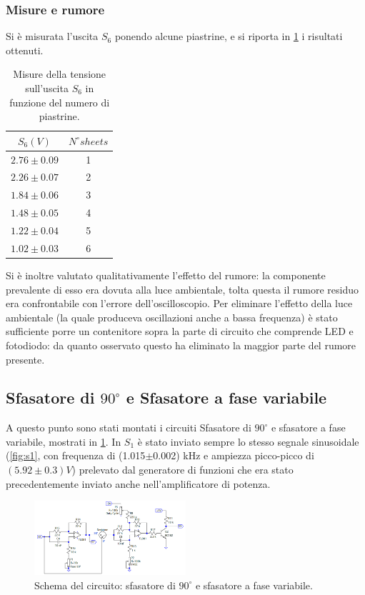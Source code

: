 \documentclass[a4paper,10pt]{article}
\begin{document}
\subsubsection*{Misure e rumore}

Si è misurata l'uscita $ S_6 $ ponendo alcune piastrine, e si riporta in \cref{tab:s6} i risultati ottenuti.

\begin{table}[H]
	\centering
	\begin{tabular}{cc}
		$ S_6 (V)$ & $ N^\circ sheets $\\
		\hline
		$ 2.76 \pm 0.09$	& 1\\
		$ 2.26 \pm 0.07$	& 2\\
		$ 1.84 \pm 0.06$	& 3\\
		$ 1.48 \pm 0.05$	& 4\\
		$ 1.22 \pm 0.04$	& 5\\
		$ 1.02 \pm 0.03$	& 6\\		
	\end{tabular}
\caption{Misure della tensione sull'uscita $ S_6 $ in funzione del numero di piastrine.}
\label{tab:s6}
\end{table}

Si è inoltre valutato qualitativamente l'effetto del rumore: la componente prevalente di esso era dovuta alla luce ambientale, tolta questa il rumore residuo era confrontabile con l'errore dell'oscilloscopio.
Per eliminare l'effetto della luce ambientale (la quale produceva oscillazioni anche a bassa frequenza) è stato sufficiente porre un contenitore sopra la parte di circuito che comprende LED e fotodiodo: da quanto osservato questo ha eliminato la maggior parte del rumore presente.

\subsection{Sfasatore di $90^\circ$ e Sfasatore a fase variabile}

A questo punto sono stati montati i circuiti Sfasatore di $90^\circ$ e sfasatore a fase variabile, mostrati in \cref{fig:deph}. In $S_1$ è stato inviato sempre lo stesso segnale sinusoidale (\cref{fig:s1}, con frequenza di (1.015$\pm$0.002) kHz e ampiezza picco-picco di $(5.92\pm0.3)V$) prelevato dal generatore di funzioni che era stato precedentemente inviato anche nell'amplificatore di potenza.

\begin{figure}[H]
	\centering
	\includegraphics[width=0.5\textwidth]{../grafici/Dephaser.png}
	\caption{Schema del circuito: sfasatore di $90^\circ$ e sfasatore a fase variabile.}
	\label{fig:deph}
\end{figure}
\end{document}
